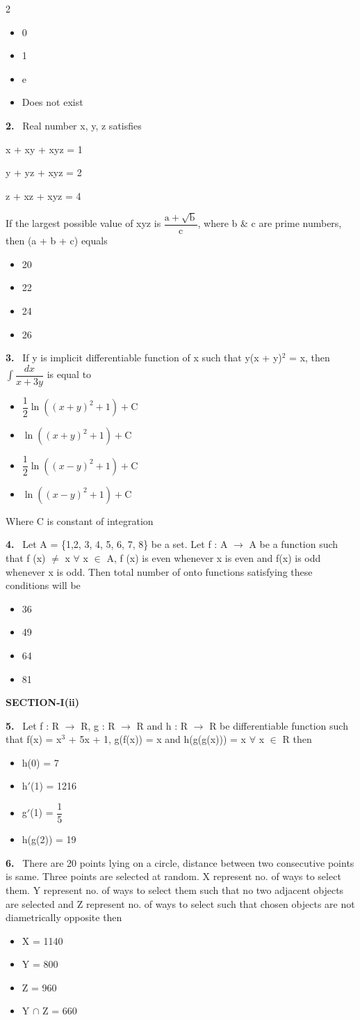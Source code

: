 \documentclass[10pt]{extarticle}
\newcommand{\sect}[1]{\par\smallskip\noindent\textbf{#1}\par}
\newcommand{\qn}[1]{\par\smallskip\noindent\textbf{#1.}~}
\newenvironment{qoptions}{\begin{itemize}[leftmargin=1.8em,itemsep=1pt,topsep=2pt,label={}]}{\end{itemize}}
\newcommand{\opt}[2]{\item[(#1)] #2}
\begin{document}
\begin{multicols}{2}
\begin{qoptions}
\opt{A}{0}
\opt{B}{1}
\opt{C}{e}
\opt{D}{Does not exist}
\end{qoptions}
\qn{2} Real number x, y, z satisfies\par
x + xy + xyz = 1\par
y + yz + xyz = 2\par
z + xz + xyz = 4\par
If the largest possible value of xyz is $\dfrac{\mathrm a+\sqrt{\mathrm b}}{\mathrm c}$, where b \& c are prime numbers, then (a + b + c) equals
\begin{qoptions}
\opt{A}{20}
\opt{B}{22}
\opt{C}{24}
\opt{D}{26}
\end{qoptions}
\qn{3} If y is implicit differentiable function of x such that y(x + y)$^2$ = x, then $\displaystyle\int\dfrac{dx}{x+3y}$ is equal to
\begin{qoptions}
\opt{A}{$\dfrac12\ln\left((x+y)^2+1\right)+\mathrm C$}
\opt{B}{$\ln\left((x+y)^2+1\right)+\mathrm C$}
\opt{C}{$\dfrac12\ln\left((x-y)^2+1\right)+\mathrm C$}
\opt{D}{$\ln\left((x-y)^2+1\right)+\mathrm C$}
\end{qoptions}
Where C is constant of integration
\qn{4} Let A = \{1,2, 3, 4, 5, 6, 7, 8\} be a set. Let f : A $\to$ A be a function such that f (x) $\neq$ x $\forall$ x $\in$ A, f (x) is even whenever x is even and f(x) is odd whenever x is odd. Then total number of onto functions satisfying these conditions will be
\begin{qoptions}
\opt{A}{36}
\opt{B}{49}
\opt{C}{64}
\opt{D}{81}
\end{qoptions}
\sect{SECTION-I(ii)}
\qn{5} Let f : R $\to$ R, g : R $\to$ R and h : R $\to$ R be differentiable function such that f(x) = x$^3$ + 5x + 1, g(f(x)) = x and h(g(g(x))) = x $\forall$ x $\in$ R then
\begin{qoptions}
\opt{A}{h(0) = 7}
\opt{B}{h$'$(1) = 1216}
\opt{C}{g$'$(1) = $\dfrac15$}
\opt{D}{h(g(2)) = 19}
\end{qoptions}
\qn{6} There are 20 points lying on a circle, distance between two consecutive points is same. Three points are selected at random. X represent no. of ways to select them. Y represent no. of ways to select them such that no two adjacent objects are selected and Z represent no. of ways to select such that chosen objects are not diametrically opposite then
\begin{qoptions}
\opt{A}{X = 1140}
\opt{B}{Y = 800}
\opt{C}{Z = 960}
\opt{D}{Y $\cap$ Z = 660}
\end{qoptions}

\end{multicols}
\end{document}
